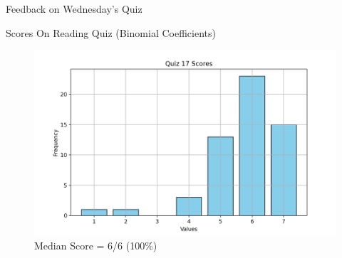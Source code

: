 \documentclass[10pt]{beamer}
\begin{document}
\begin{frame}[standout]
Feedback on Wednesday's Quiz 
\end{frame}



\begin{frame}{Scores On Reading Quiz (Binomial Coefficients)}
\footnotesize 
\begin{figure}[ht]
        \centering
        \includegraphics[width=.8\textwidth]{images/reading_quiz_scores}
   		 \caption{Median Score = 6/6 (100\%)}
\end{figure}
\end{frame}
\end{document}
